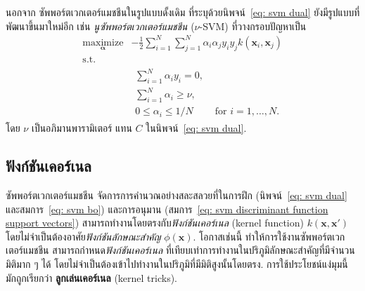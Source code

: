 นอกจาก
ซัพพอร์ตเวกเตอร์แมชชีนในรูปแบบดั้งเดิม ที่ระบุด้วยนิพจน์~\ref{eq: svm dual} 
ยังมีรูปแบบที่พัฒนาขึ้นมาใหม่อีก
เช่น \textit{นูซัพพอร์ตเวกเตอร์แมชชีน} ($\nu$-SVM\cite{SchoelkopfEtAl2000a})
ที่วางกรอบปัญหาเป็น
\begin{eqnarray}
\underset{\bm{\alpha}}{\mathrm{maximize}} &  
- \frac{1}{2}\sum_{i=1}^N \sum_{j=1}^N \alpha_i \alpha_j y_i y_j k(\bm{x}_i, \bm{x}_j) 
\nonumber \\
\mbox{s.t.} & 
\nonumber \\
&
\begin{array}{ll}
\sum_{i=1}^N \alpha_i y_i = 0, &  \\
\sum_{i=1}^N \alpha_i \geq \nu , & \\
0 \leq \alpha_i \leq 1/N & \mbox{ for } i =1, \ldots, N.
\end{array}
\label{eq: nu-svm}
\end{eqnarray}
โดย $\nu$ เป็นอภิมานพารามิเตอร์ แทน $C$ ในนิพจน์~\ref{eq: svm dual}.

\subsection{ฟังก์ชันเคอร์เนล}
\label{sec: svm kernel function}

ซัพพอร์ตเวกเตอร์แมชชีน จัดการการคำนวณอย่างสละสลวยที่ในการฝึก (นิพจน์~\ref{eq: svm dual} และสมการ~\ref{eq: svm bo})
และการอนุมาน (สมการ~\ref{eq: svm discriminant function support vectors})
สามารถทำงานโดยตรงกับ\textit{ฟังก์ชันเคอร์เนล} (kernel function) $k(\bm{x}, \bm{x}')$
โดยไม่จำเป็นต้องอาศัย\textit{ฟังก์ชันลักษณะสำคัญ} $\phi(\bm{x})$.
โอกาสเช่นนี้ ทำให้การใช้งานซัพพอร์ตเวกเตอร์แมชชีน สามารถกำหนด\textit{ฟังก์ชันเคอร์เนล}
ที่เทียบเท่าการทำงานในปริภูมิลักษณะสำคัญที่มีจำนวนมิติมาก ๆ ได้ โดยไม่จำเป็นต้องเข้าไปทำงานในปริภูมิที่มีมิติสูงนั้นโดยตรง.
การใช้ประโยชน์แง่มุมนี้ มักถูกเรียกว่า \textbf{ลูกเล่นเคอร์เนล} (kernel tricks).

